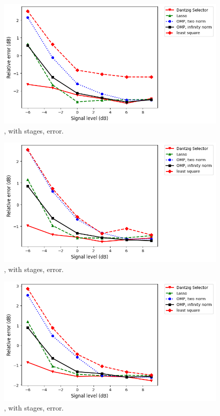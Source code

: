 \begin {figure} [H]
\includegraphics [width = \textwidth] {error-big-square-four.png}
\caption {, with  stages, error.}
\end {figure}

\begin {figure} [H]
\includegraphics [width = \textwidth] {error-big-tall-four.png}
\caption {, with  stages, error.}
\end {figure}

\begin {figure} [H]
\includegraphics [width = \textwidth] {error-big-wide-four.png}
\caption {, with  stages, error.}
\end {figure}


